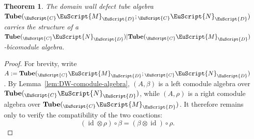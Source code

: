 \documentclass[a4paper,11pt]{article}
\newtheorem{theorem}{Theorem}[section]
\theoremstyle{definition}
\theoremstyle{remark}
\newcommand\eC           {\EuScript{C}}
\newcommand\eD           {\EuScript{D}}
\newcommand\eM          {\EuScript{M}}
\newcommand\eN         {\EuScript{N}}
\newcommand{\id}{\operatorname{id}}
\begin{document}
\begin{theorem}
    The domain wall defect tube algebra $\mathbf{Tube}({_{\eC}}\eM_\eD;{_{\eC}}\eN_\eD)$ carries the structure of a $\mathbf{Tube}(_{\eC}\eN_{\eD})|\mathbf{Tube}(_{\eC}\eM_{\eD})$-bicomodule algebra. 
\end{theorem}

\begin{proof}
    For brevity, write $A:=\mathbf{Tube}({_{\eC}}\eM_\eD;{_{\eC}}\eN_\eD)$. By Lemma~\ref{lem:DW-comodule-algebra}, $(A,\beta)$ is a left comodule algebra over $\mathbf{Tube}({_{\eC}}\eN_\eD)$, while $(A,\rho)$ is a right comodule algebra over $\mathbf{Tube}({_{\eC}}\eM_\eD)$. It therefore remains only to verify the compatibility of the two coactions:
    \begin{equation} \label{eq:beta-rho-compatible}
        (\id\otimes\rho)\circ\beta = (\beta\otimes\id)\circ\rho.
    \end{equation}
    

\end{proof}
\end{document}
